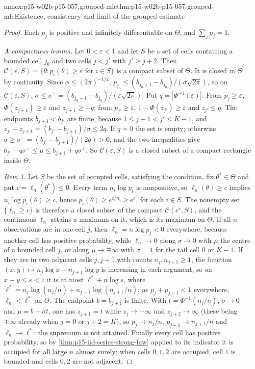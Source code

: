 \begin{annexitem}{annex:p15-w02b-p15-057.grouped-mle}{thm:p15-w02b-p15-057-grouped-mle}{Existence, consistency and limit of the grouped estimate}
\begin{proof}
Each \(p_j\) is positive and infinitely differentiable on \(\Theta\), and
\(\sum_jp_j=1\).

\emph{A compactness lemma.} Let \(0<\varepsilon<1\) and let \(S\) be a set
of cells containing a bounded cell \(j_0\) and two cells \(j<j'\) with
\(j'\geq j+2\). Then \(\mathcal C(\varepsilon,S)=\{\theta:p_i(\theta)\geq\varepsilon
\text{ for } i\in S\}\) is a compact subset of \(\Theta\). It is closed in
\(\Theta\) by continuity. Since \(\phi\leq(2\pi)^{-1/2}\),
\(p_{j_0}\leq(b_{j_0+1}-b_{j_0})/(\sigma\sqrt{2\pi})\), so on
\(\mathcal C(\varepsilon,S)\),
\(\sigma\leq\sigma^+=(b_{j_0+1}-b_{j_0})/(\varepsilon\sqrt{2\pi})\). Put
\(q=|\Phi^{-1}(\varepsilon)|\). From \(p_j\geq\varepsilon\),
\(\Phi(z_{j+1})\geq\varepsilon\) and \(z_{j+1}\geq-q\); from
\(p_{j'}\geq\varepsilon\), \(1-\Phi(z_{j'})\geq\varepsilon\) and
\(z_{j'}\leq q\). The endpoints \(b_{j+1}<b_{j'}\) are finite, because
\(1\leq j+1<j'\leq K-1\), and
\(z_{j'}-z_{j+1}=(b_{j'}-b_{j+1})/\sigma\leq2q\). If \(q=0\) the set is
empty; otherwise \(\sigma\geq\sigma^-=(b_{j'}-b_{j+1})/(2q)>0\), and the
two inequalities give \(b_{j'}-q\sigma^+\leq\mu\leq b_{j+1}+q\sigma^+\).
So \(\mathcal C(\varepsilon,S)\) is a closed subset of a compact rectangle inside
\(\Theta\).

\emph{Item 1.} Let \(S\) be the set of occupied cells, satisfying the
condition, fix \(\theta^*\in\Theta\) and put \(c=\ell_n(\theta^*)\leq0\).
Every term \(n_i\log p_i\) is nonpositive, so \(\ell_n(\theta)\geq c\)
implies \(n_i\log p_i(\theta)\geq c\), hence \(p_i(\theta)\geq e^{c/n_i}
\geq e^c\), for each \(i\in S\). The nonempty set \(\{\ell_n\geq c\}\) is
therefore a closed subset of the compact \(\mathcal C(e^c,S)\), and the continuous
\(\ell_n\) attains a maximum on it, which is its maximum on \(\Theta\).
If all \(n\) observations are in one cell \(j\), then \(\ell_n=n\log p_j<0\)
everywhere, because another cell has positive probability, while
\(\ell_n\to0\) along \(\sigma\to0\) with \(\mu\) the centre of a bounded
cell \(j\), or along \(\mu\to\mp\infty\) with \(\sigma=1\) for the tail
cell \(0\) or \(K-1\). If they are in two adjacent cells \(j,j+1\) with
counts \(n_j,n_{j+1}\geq1\), the function \((x,y)\mapsto n_j\log x+
n_{j+1}\log y\) is increasing in each argument, so on \(x+y\leq s<1\) it
is at most \(\ell^*+n\log s\), where
\(\ell^*=n_j\log(n_j/n)+n_{j+1}\log(n_{j+1}/n)\); as
\(p_j+p_{j+1}<1\) everywhere, \(\ell_n<\ell^*\) on \(\Theta\). The endpoint
\(b=b_{j+1}\) is finite. With \(t=\Phi^{-1}(n_j/n)\),
\(\sigma\to0\) and \(\mu=b-\sigma t\), one has \(z_{j+1}=t\) while
\(z_j\to-\infty\) and \(z_{j+2}\to\infty\) (these being \(\mp\infty\)
already when \(j=0\) or \(j+2=K\)), so \(p_j\to n_j/n\),
\(p_{j+1}\to n_{j+1}/n\) and \(\ell_n\to\ell^*\): the supremum is not
attained. Finally every cell has positive probability, so by
\cref{thm:p15-iid-series-strong-law} applied to its indicator it is
occupied for all large \(n\) almost surely; when cells \(0,1,2\) are
occupied, cell \(1\) is bounded and cells \(0,2\) are not adjacent.


\end{proof}
\end{annexitem}
